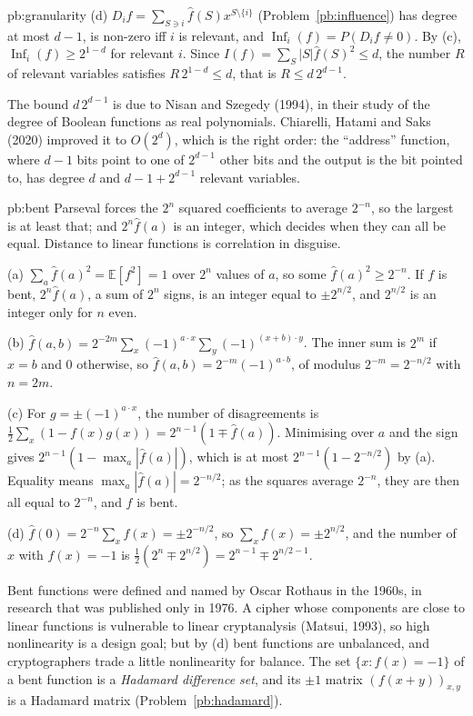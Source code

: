 \begin{solution}{pb:granularity}
(d) $D_if=\sum_{S\ni i}\hat f(S)x^{S\setminus\{i\}}$ (Problem~\ref{pb:influence}) has degree at most $d-1$, is non-zero iff $i$ is relevant, and
$\operatorname{Inf}_i(f)=P(D_if\ne0)$. By (c), $\operatorname{Inf}_i(f)\ge2^{1-d}$ for relevant $i$. Since $I(f)=\sum_S|S|\hat f(S)^2\le d$, the number $R$ of relevant variables
satisfies $R\,2^{1-d}\le d$, that is $R\le d\,2^{d-1}$.

\leads The bound $d\,2^{d-1}$ is due to Nisan and Szegedy (1994), in their study of the degree of Boolean functions as real
polynomials. Chiarelli, Hatami and Saks (2020) improved it to $O(2^d)$, which is the right order: the ``address'' function, where $d-1$
bits point to one of $2^{d-1}$ other bits and the output is the bit pointed to, has degree $d$ and $d-1+2^{d-1}$ relevant variables.
\end{solution}

\begin{solution}{pb:bent}
\idea Parseval forces the $2^n$ squared coefficients to average $2^{-n}$, so the largest is at least that; and $2^n\hat f(a)$ is an integer,
which decides when they can all be equal. Distance to linear functions is correlation in disguise.

\writeup (a) $\sum_a\hat f(a)^2=\mathbb E[f^2]=1$ over $2^n$ values of $a$, so some $\hat f(a)^2\ge2^{-n}$. If $f$ is bent, $2^n\hat f(a)$, a sum of $2^n$ signs, is an
integer equal to $\pm2^{n/2}$, and $2^{n/2}$ is an integer only for $n$ even.

(b) $\hat f(a,b)=2^{-2m}\sum_x(-1)^{a\cdot x}\sum_y(-1)^{(x+b)\cdot y}$. The inner sum is $2^m$ if $x=b$ and $0$ otherwise, so $\hat f(a,b)=2^{-m}(-1)^{a\cdot b}$, of modulus
$2^{-m}=2^{-n/2}$ with $n=2m$.

(c) For $g=\pm(-1)^{a\cdot x}$, the number of disagreements is $\frac12\sum_x(1-f(x)g(x))=2^{n-1}(1\mp\hat f(a))$. Minimising over $a$ and the sign gives
$2^{n-1}(1-\max_a|\hat f(a)|)$, which is at most $2^{n-1}(1-2^{-n/2})$ by (a). Equality means $\max_a|\hat f(a)|=2^{-n/2}$; as the squares average $2^{-n}$,
they are then all equal to $2^{-n}$, and $f$ is bent.

(d) $\hat f(0)=2^{-n}\sum_xf(x)=\pm2^{-n/2}$, so $\sum_xf(x)=\pm2^{n/2}$, and the number of $x$ with $f(x)=-1$ is $\frac12(2^n\mp2^{n/2})=2^{n-1}\mp2^{n/2-1}$.

\leads Bent functions were defined and named by Oscar Rothaus in the 1960s, in research that was published only in 1976. A cipher whose
components are close to linear functions is vulnerable to linear cryptanalysis (Matsui, 1993), so high nonlinearity is a design
goal; but by (d) bent functions are unbalanced, and cryptographers trade a little nonlinearity for balance. The set
$\{x:f(x)=-1\}$ of a bent function is a \emph{Hadamard difference set}, and its $\pm1$ matrix $(f(x+y))_{x,y}$ is a Hadamard matrix
(Problem~\ref{pb:hadamard}).
\end{solution}

